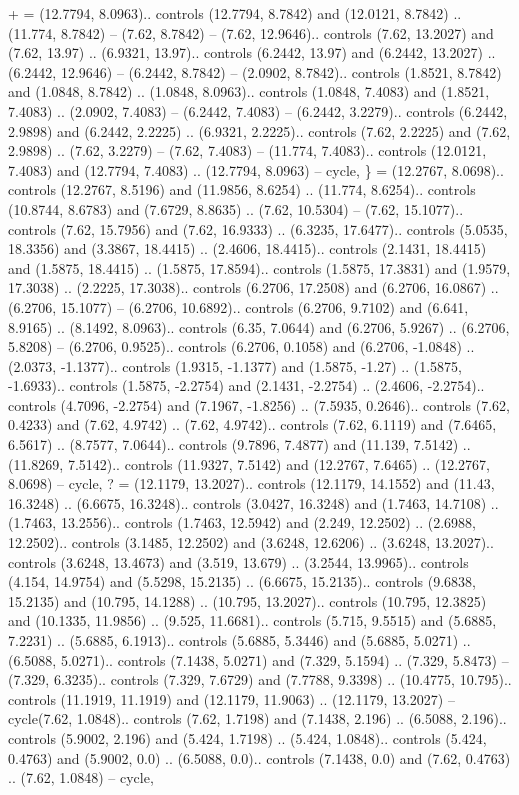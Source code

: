 {+} = {(12.7794, 8.0963).. controls (12.7794, 8.7842) and (12.0121, 8.7842) .. (11.774, 8.7842) -- (7.62, 8.7842) -- (7.62, 12.9646).. controls (7.62, 13.2027) and (7.62, 13.97) .. (6.9321, 13.97).. controls (6.2442, 13.97) and (6.2442, 13.2027) .. (6.2442, 12.9646) -- (6.2442, 8.7842) -- (2.0902, 8.7842).. controls (1.8521, 8.7842) and (1.0848, 8.7842) .. (1.0848, 8.0963).. controls (1.0848, 7.4083) and (1.8521, 7.4083) .. (2.0902, 7.4083) -- (6.2442, 7.4083) -- (6.2442, 3.2279).. controls (6.2442, 2.9898) and (6.2442, 2.2225) .. (6.9321, 2.2225).. controls (7.62, 2.2225) and (7.62, 2.9898) .. (7.62, 3.2279) -- (7.62, 7.4083) -- (11.774, 7.4083).. controls (12.0121, 7.4083) and (12.7794, 7.4083) .. (12.7794, 8.0963) -- cycle},
{\}} = {(12.2767, 8.0698).. controls (12.2767, 8.5196) and (11.9856, 8.6254) .. (11.774, 8.6254).. controls (10.8744, 8.6783) and (7.6729, 8.8635) .. (7.62, 10.5304) -- (7.62, 15.1077).. controls (7.62, 15.7956) and (7.62, 16.9333) .. (6.3235, 17.6477).. controls (5.0535, 18.3356) and (3.3867, 18.4415) .. (2.4606, 18.4415).. controls (2.1431, 18.4415) and (1.5875, 18.4415) .. (1.5875, 17.8594).. controls (1.5875, 17.3831) and (1.9579, 17.3038) .. (2.2225, 17.3038).. controls (6.2706, 17.2508) and (6.2706, 16.0867) .. (6.2706, 15.1077) -- (6.2706, 10.6892).. controls (6.2706, 9.7102) and (6.641, 8.9165) .. (8.1492, 8.0963).. controls (6.35, 7.0644) and (6.2706, 5.9267) .. (6.2706, 5.8208) -- (6.2706, 0.9525).. controls (6.2706, 0.1058) and (6.2706, -1.0848) .. (2.0373, -1.1377).. controls (1.9315, -1.1377) and (1.5875, -1.27) .. (1.5875, -1.6933).. controls (1.5875, -2.2754) and (2.1431, -2.2754) .. (2.4606, -2.2754).. controls (4.7096, -2.2754) and (7.1967, -1.8256) .. (7.5935, 0.2646).. controls (7.62, 0.4233) and (7.62, 4.9742) .. (7.62, 4.9742).. controls (7.62, 6.1119) and (7.6465, 6.5617) .. (8.7577, 7.0644).. controls (9.7896, 7.4877) and (11.139, 7.5142) .. (11.8269, 7.5142).. controls (11.9327, 7.5142) and (12.2767, 7.6465) .. (12.2767, 8.0698) -- cycle},
{?} = {(12.1179, 13.2027).. controls (12.1179, 14.1552) and (11.43, 16.3248) .. (6.6675, 16.3248).. controls (3.0427, 16.3248) and (1.7463, 14.7108) .. (1.7463, 13.2556).. controls (1.7463, 12.5942) and (2.249, 12.2502) .. (2.6988, 12.2502).. controls (3.1485, 12.2502) and (3.6248, 12.6206) .. (3.6248, 13.2027).. controls (3.6248, 13.4673) and (3.519, 13.679) .. (3.2544, 13.9965).. controls (4.154, 14.9754) and (5.5298, 15.2135) .. (6.6675, 15.2135).. controls (9.6838, 15.2135) and (10.795, 14.1288) .. (10.795, 13.2027).. controls (10.795, 12.3825) and (10.1335, 11.9856) .. (9.525, 11.6681).. controls (5.715, 9.5515) and (5.6885, 7.2231) .. (5.6885, 6.1913).. controls (5.6885, 5.3446) and (5.6885, 5.0271) .. (6.5088, 5.0271).. controls (7.1438, 5.0271) and (7.329, 5.1594) .. (7.329, 5.8473) -- (7.329, 6.3235).. controls (7.329, 7.6729) and (7.7788, 9.3398) .. (10.4775, 10.795).. controls (11.1919, 11.1919) and (12.1179, 11.9063) .. (12.1179, 13.2027) -- cycle(7.62, 1.0848).. controls (7.62, 1.7198) and (7.1438, 2.196) .. (6.5088, 2.196).. controls (5.9002, 2.196) and (5.424, 1.7198) .. (5.424, 1.0848).. controls (5.424, 0.4763) and (5.9002, 0.0) .. (6.5088, 0.0).. controls (7.1438, 0.0) and (7.62, 0.4763) .. (7.62, 1.0848) -- cycle},
